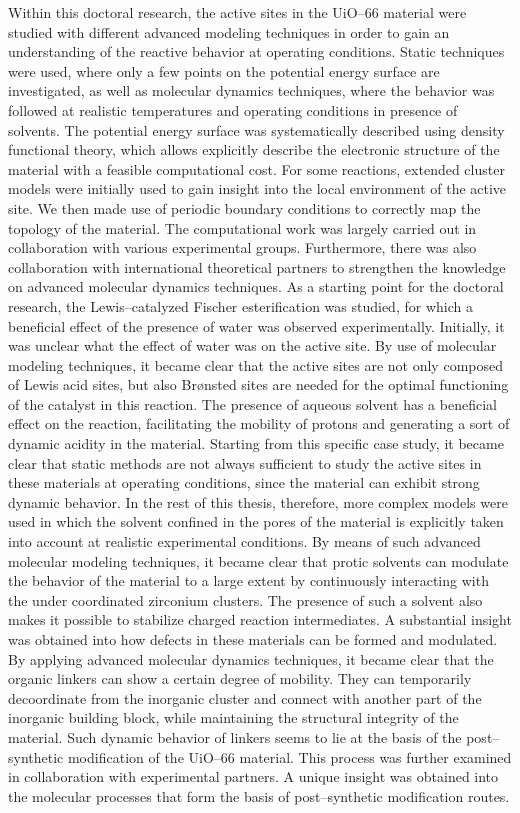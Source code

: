 \npar
Within this doctoral research, the active sites in the UiO--66 material were studied with different advanced modeling techniques in order to gain an understanding of the reactive behavior at operating conditions. Static techniques were used, where only a few points on the potential energy surface are investigated, as well as molecular dynamics techniques, where the behavior was followed at realistic temperatures and operating conditions in presence of solvents. The potential energy surface was systematically described using density functional theory, which allows explicitly describe the electronic structure of the material with a feasible computational cost. For some reactions, extended cluster models were initially used to gain insight into the local environment of the active site. We then made use of periodic boundary conditions to correctly map the topology of the material. The computational work was largely carried out in collaboration with various experimental groups. Furthermore, there was also collaboration with international theoretical partners to strengthen the knowledge on advanced molecular dynamics techniques.
\npar
As a starting point for the doctoral research, the Lewis--catalyzed Fischer esterification was studied, for which a beneficial effect of the presence of water was observed experimentally. Initially, it was unclear what the effect of water was on the active site. By use of molecular modeling techniques, it became clear that the active sites are not only composed of Lewis acid sites, but also Br\o{}nsted sites are needed for the optimal functioning of the catalyst in this reaction. The presence of aqueous solvent has a beneficial effect on the reaction, facilitating the mobility of protons and generating a sort of dynamic acidity in the material.
\npar
Starting from this specific case study, it became clear that static methods are not always sufficient to study the active sites in these materials at operating conditions, since the material can exhibit strong dynamic behavior. In the rest of this thesis, therefore, more complex models were used in which the solvent confined in the pores of the material is explicitly taken into account at realistic experimental conditions. By means of such advanced molecular modeling techniques, it became clear that protic solvents can modulate the behavior of the material to a large extent by continuously interacting with the under coordinated zirconium clusters. The presence of such a solvent also makes it possible to stabilize charged reaction intermediates. A substantial insight was obtained into how defects in these materials can be formed and modulated. By applying advanced molecular dynamics techniques, it became clear that the organic linkers can show a certain degree of mobility. They can temporarily decoordinate from the inorganic cluster and connect with another part of the inorganic building block, while maintaining the structural integrity of the material. Such dynamic behavior of linkers seems to lie at the basis of the post--synthetic modification of the UiO--66 material. This process was further examined in collaboration with experimental partners. A unique insight was obtained into the molecular processes that form the basis of post--synthetic modification routes.  
